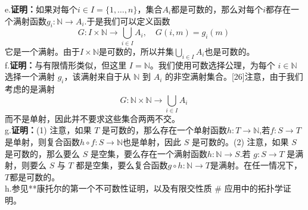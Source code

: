 e.\textbf{证明：}如果对每个$i \in I = \{1, \dots , n\}$，集合$A_i$都是可数的，那么对每个$i$都存在一个满射函数$g_i : \mathbb{N} \to A_i$.于是我们可以定义函数
$$
G : I \times \mathbb{N} \to \bigcup_{i \in I} A_i, \quad G(i,m) = g_i(m)~
$$
它是一个满射。由于$I \times \mathbb{N}$是可数的，所以并集$\bigcup_{i \in I} A_i$也是可数的。\\
f.\textbf{证明：}与有限情形类似，但这里 $I = \mathbb{N}$。我们使用可数选择公理，为每个 $i \in \mathbb{N}$ 选择一个满射 $g_i$，该满射来自于从 $\mathbb{N}$ 到 $A_i$ 的非空满射集合。[26]注意，由于我们考虑的是满射
$$
G : \mathbb{N} \times \mathbb{N} \to \bigcup_{i \in I} A_i~
$$
而不是单射，因此并不要求这些集合两两不交。\\
g.\textbf{证明：}(1) 注意，如果 $T$ 是可数的，那么存在一个单射函数$h : T \to \mathbb{N}$,若$f : S \to T$是单射，则复合函数$h \circ f : S \to \mathbb{N}$也是单射，因此 $S$ 是可数的。(2) 注意，如果 $S$ 是可数的，那么要么 $S$ 是空集，要么存在一个满射函数$h : \mathbb{N} \to S$.若 $g : S \to T$ 是满射，则要么 $S$ 与 $T$ 都是空集，要么复合函数$g \circ h : \mathbb{N} \to T$是满射。在任一情况下，$T$都是可数的。\\
h.参见**康托尔的第一个不可数性证明，以及有限交性质 # 应用中的拓扑学证明。
